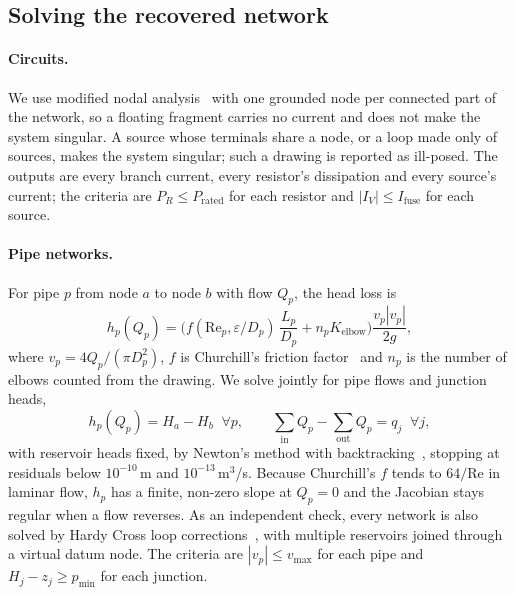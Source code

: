 \subsection{Solving the recovered network}
\paragraph{Circuits.} We use modified nodal analysis~\cite{ho1975mna} with one grounded node per connected
part of the network, so a floating fragment carries no current and does not make the system singular. A source
whose terminals share a node, or a loop made only of sources, makes the system singular; such a drawing is
reported as ill-posed. The outputs are every branch current, every resistor's dissipation and every source's
current; the criteria are $P_R \le P_\text{rated}$ for each resistor and $|I_V| \le I_\text{fuse}$ for each
source.

\paragraph{Pipe networks.} For pipe $p$ from node $a$ to node $b$ with flow $Q_p$, the head loss is
\begin{equation}
h_p(Q_p) = \Big(f(\mathrm{Re}_p,\varepsilon/D_p)\,\frac{L_p}{D_p} + n_p K_\text{elbow}\Big)
\frac{v_p |v_p|}{2g},
\end{equation}
where $v_p = 4Q_p/(\pi D_p^2)$, $f$ is Churchill's friction factor~\cite{churchill1977} and $n_p$ is the number
of elbows counted from the drawing. We solve jointly for pipe flows and junction heads,
\begin{equation}
h_p(Q_p) = H_a - H_b \;\;\forall p, \qquad
\textstyle\sum_{\text{in}} Q_p - \sum_{\text{out}} Q_p = q_j \;\;\forall j,
\end{equation}
with reservoir heads fixed, by Newton's method with backtracking~\cite{todini1988}, stopping at residuals below
$10^{-10}$\,m and $10^{-13}$\,m$^3$/s. Because Churchill's $f$ tends to $64/\mathrm{Re}$ in laminar flow, $h_p$
has a finite, non-zero slope at $Q_p = 0$ and the Jacobian stays regular when a flow reverses. As an independent
check, every network is also solved by Hardy Cross loop corrections~\cite{hardycross1936}, with multiple
reservoirs joined through a virtual datum node. The criteria are $|v_p| \le v_\text{max}$ for each pipe and
$H_j - z_j \ge p_\text{min}$ for each junction.

